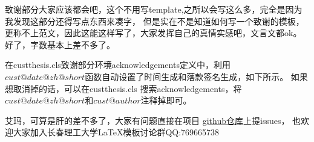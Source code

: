 
\begin{acknowledgements}

致谢部分大家应该都会吧，这个不用写template,之所以会写这么多，完全是因为我发现这部分还得写点东西来凑字，
但是实在不是知道如何写一个致谢的模板，更称不上范文，因此这能这样写了，大家发挥自己的真情实感吧，文言文都ok。
好了，字数基本上差不多了。

在custthesis.cls致谢部分环境acknowledgements定义中，利用$cust@date@zh@short$函数自动设置了时间生成和落款签名生成，如下所示。
如果想取消掉的话，可以在custthesis.cls 搜索acknowledgements，将$cust@date@zh@short$和$cust@author$注释掉即可。

艾玛，可算是肝的差不多了，大家有问题直接在项目
\href{https://github.com/CVIR-Lab/LaTeX-template-for-CUST-thesis}{github仓库}上提issues，
也欢迎大家加入长春理工大学\LaTeX{}模板讨论群QQ:769665738

\end{acknowledgements}
